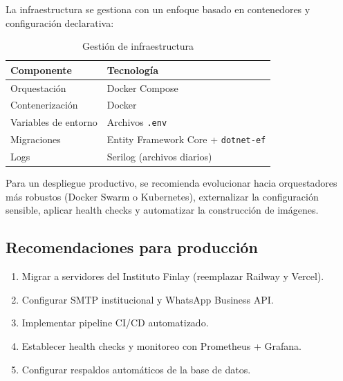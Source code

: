 \documentclass[12pt,letterpaper]{article}
\begin{document}
La infraestructura se gestiona con un enfoque basado en contenedores y configuración declarativa:

\begin{table}[H]
\centering
\caption{Gestión de infraestructura}
\label{tab:infraestructura}
\begin{tabular}{|l|l|}
\hline
\textbf{Componente} & \textbf{Tecnología} \\ \hline
Orquestación & Docker Compose \\ \hline
Contenerización & Docker \\ \hline
Variables de entorno & Archivos \texttt{.env} \\ \hline
Migraciones & Entity Framework Core + \texttt{dotnet-ef} \\ \hline
Logs & Serilog (archivos diarios) \\ \hline
\end{tabular}
\end{table}

Para un despliegue productivo, se recomienda evolucionar hacia orquestadores más robustos (Docker Swarm o Kubernetes), externalizar la configuración sensible, aplicar health checks y automatizar la construcción de imágenes.

\subsection{Recomendaciones para producción}

\begin{enumerate}
    \item Migrar a servidores del Instituto Finlay (reemplazar Railway y Vercel).
    \item Configurar SMTP institucional y WhatsApp Business API.
    \item Implementar pipeline CI/CD automatizado.
    \item Establecer health checks y monitoreo con Prometheus + Grafana.
    \item Configurar respaldos automáticos de la base de datos.
\end{enumerate}









\end{document}
